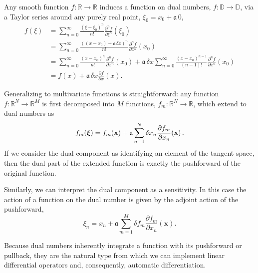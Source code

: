 Any smooth function $f : \mathbb{R} \rightarrow \mathbb{R}$ induces a function on 
dual numbers, $f : \mathbb{D} \rightarrow \mathbb{D}$, via a Taylor series around any 
purely real point, $\xi_{0} = x_{0} + \mathfrak{a} \, 0$,
%
\begin{align*}
f \! \left( \xi \right) 
&= 
\sum_{n = 0}^{\infty} \frac{ \left( \xi - \xi_{0} \right)^{n} }{n!} 
\frac{ \partial^{n} f }{ \partial \xi^{n} } \! \left( \xi_{0} \right) 
\\
&= 
\sum_{n = 0}^{\infty} \frac{ \left( \left( x - x_{0} \right) + \mathfrak{a} \, \delta x \right)^{n} }{n!} 
\frac{ \partial^{n} f }{ \partial x^{n} } \! \left( x_{0} \right)
\\
&= 
\sum_{n = 0}^{\infty} \frac{ \left( x - x_{0} \right)^{n} }{n!} 
\frac{ \partial^{n} f }{ \partial x^{n} } \! \left( x_{0} \right)
+ \mathfrak{a} \, \delta x \sum_{n = 0}^{\infty} \frac{ \left( x - x_{0} \right)^{n - 1} }{\left( n - 1 \right)!} 
\frac{ \partial^{n} f }{ \partial x^{n} } \! \left( x_{0} \right) 
\\
&= 
f \! \left( x \right) 
+ \mathfrak{a} \, \delta x \frac{ \partial f }{ \partial x } \! \left( x \right).
\end{align*}

Generalizing to multivariate functions is straightforward: any function 
$f : \mathbb{R}^{N} \rightarrow \mathbb{R}^{M}$ is first decomposed into $M$
functions, $f_{m} : \mathbb{R}^{N} \rightarrow \mathbb{R}$, which extend
to dual numbers as
%
\begin{equation} \label{dual_function}
f_{m} \! \left( \mbox{\boldmath{$\xi$}} \right) = f_{m} \! \left( \mathbf{x} \right) 
+ \mathfrak{a} \sum_{n = 1}^{N} 
\delta x_{n} \frac{ \partial f_{m} }{ \partial x_{n} } \! \left( \mathbf{x} \right).
\end{equation}
%
If we consider the dual component as identifying an element of the tangent
space, then the dual part of the extended function is exactly the pushforward 
of the original function.  

Similarly, we can interpret the dual component as a sensitivity.  In this case
the action of a function on the dual number is given by the adjoint action of the
pushforward,
%
\begin{equation} \label{dual_function}
\xi_{n}  = x_{n}  + \mathfrak{a} \sum_{m = 1}^{M} 
\delta f_{m} \frac{ \partial f_{m} }{ \partial x_{n} } \! \left( \mathbf{x} \right).
\end{equation} 

Because dual numbers inherently integrate a function with its pushforward or
pullback, they are the natural type from which we can implement linear
differential operators and, consequently, automatic differentiation.

